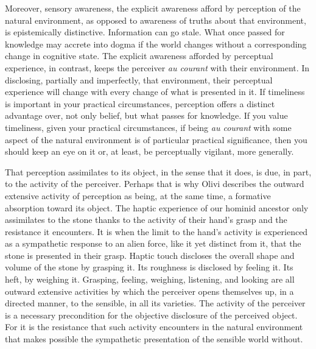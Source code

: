 Moreover, sensory awareness, the explicit awareness afford by perception of the natural environment, as opposed to awareness of truths about that environment, is epistemically distinctive. Information can go stale. What once passed for knowledge may accrete into dogma if the world changes without a corresponding change in cognitive state. The explicit awareness afforded by perceptual experience, in contrast, keeps the perceiver \emph{au courant} with their environment. In disclosing, partially and imperfectly, that environment, their perceptual experience will change with every change of what is presented in it. If timeliness is important in your practical circumstances, perception offers a distinct advantage over, not only belief, but what passes for knowledge. If you value timeliness, given your practical circumstances, if being \emph{au courant} with some aspect of the natural environment is of particular practical significance, then you should keep an eye on it or, at least, be perceptually vigilant, more generally.

That perception assimilates to its object, in the sense that it does, is due, in part, to the activity of the perceiver. Perhaps that is why Olivi describes the outward extensive activity of perception as being, at the same time, a formative absorption toward its object.  The haptic experience of our hominid ancestor only assimilates to the stone thanks to the activity of their hand's grasp and the resistance it encounters. It is when the limit to the hand's activity is experienced as a sympathetic response to an alien force, like it yet distinct from it, that the stone is presented in their grasp. Haptic touch discloses the overall shape and volume of the stone by grasping it. Its roughness is disclosed by feeling it. Its heft, by weighing it. Grasping, feeling, weighing, listening, and looking are all outward extensive activities by which the perceiver opens themselves up, in a directed manner, to the sensible, in all its varieties. The activity of the perceiver is a necessary precondition for the objective disclosure of the perceived object. For it is the resistance that such activity encounters in the natural environment that makes possible the sympathetic presentation of the sensible world without.

